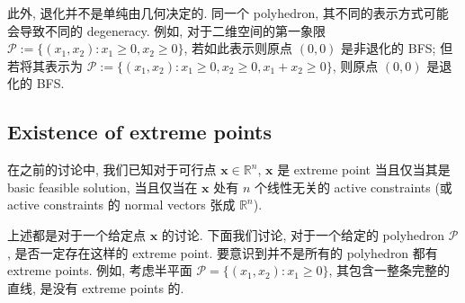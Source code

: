 此外, 退化并不是单纯由几何决定的. 同一个 polyhedron, 其不同的表示方式可能会导致不同的 degeneracy. 例如, 对于二维空间的第一象限 $\mathcal{P} := \{(x_1, x_2): x_1 \geq 0, x_2 \geq 0\}$, 若如此表示则原点 $(0, 0)$ 是非退化的 BFS; 但若将其表示为 $\mathcal{P} := \{(x_1, x_2): x_1 \geq 0, x_2 \geq 0, x_1 + x_2 \geq 0\}$, 则原点 $(0, 0)$ 是退化的 BFS.

\subsection{Existence of extreme points}

在之前的讨论中, 我们已知对于可行点 $\bm{x} \in \mathbb{R}^n$, $\bm{x}$ 是 extreme point 当且仅当其是 basic feasible solution, 当且仅当在 $\bm{x}$ 处有 $n$ 个线性无关的 active constraints (或 active constraints 的 normal vectors 张成 $\mathbb{R}^n$).

上述都是对于一个给定点 $\bm{x}$ 的讨论. 下面我们讨论, 对于一个给定的 polyhedron $\mathcal{P}$, 是否一定存在这样的 extreme point. 要意识到并不是所有的 polyhedron 都有 extreme points. 例如, 考虑半平面 $\mathcal{P} = \{(x_1, x_2): x_1 \geq 0\}$, 其包含一整条完整的直线, 是没有 extreme points 的.


